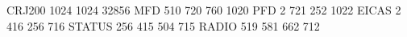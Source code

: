 CRJ200 1024 1024 32856
MFD    510 720 760 1020
PFD      2 721 252 1022
EICAS    2 416 256  716
STATUS 256 415 504  715
RADIO  519 581 662  712
